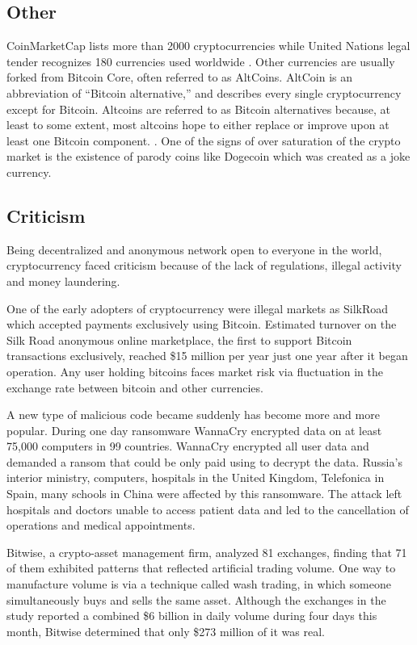 \subsection{Other}
CoinMarketCap lists more than 2000 cryptocurrencies while United Nations legal tender recognizes 180 currencies used worldwide \cite{List_of_circulating_currencies}. Other currencies are usually forked from Bitcoin Core, often referred to as AltCoins. AltCoin is an abbreviation of “Bitcoin alternative,” and  describes every single cryptocurrency except for Bitcoin. Altcoins are referred to as Bitcoin alternatives because, at least to some extent, most altcoins hope to either replace or improve upon at least one Bitcoin component. \cite{altcoin}. One of the signs of over saturation of the crypto market is the existence of parody coins like Dogecoin which was created as a joke currency. 

\subsection{Criticism}
Being decentralized and anonymous network open to everyone in the world, cryptocurrency faced criticism because of the lack of regulations, illegal activity and money laundering.

One of the early adopters of cryptocurrency were illegal markets as SilkRoad which accepted payments exclusively using Bitcoin. Estimated  turnover on the Silk Road anonymous online marketplace, the first to  support  Bitcoin  transactions  exclusively,  reached  \$15  million  per  year  just  one  year after it began operation. Any user holding bitcoins faces market risk via fluctuation in the exchange rate between bitcoin and other currencies. \cite{bitocin_doi}

A new type of malicious code became suddenly has become more and more popular. During one day ransomware WannaCry encrypted data on at least 75,000 computers in 99 countries. WannaCry encrypted all user data and demanded a ransom that could be only paid using  to decrypt the data. Russia's interior ministry, computers, hospitals in the United Kingdom, Telefonica in Spain, many schools in China were affected by this ransomware. The attack left hospitals and doctors unable to access patient data and led to the cancellation of operations and medical appointments. \cite{ransomware} 

Bitwise, a crypto-asset management firm, analyzed 81 exchanges, finding that 71 of them exhibited patterns that reflected artificial trading volume. One way to manufacture volume is via a technique called wash trading, in which someone simultaneously buys and sells the same asset. Although the exchanges in the study reported a combined \$6 billion in daily volume during four days this month, Bitwise determined that only \$273 million of it was real. \cite{bitwise_bitwise}